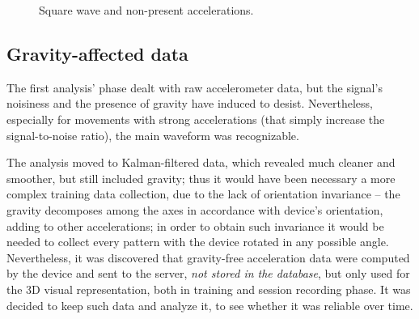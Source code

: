 \begin{center}
	\begin{figure}[ht]
		\caption{Square wave and non-present accelerations.}
	\end{figure}
\end{center}

\subsection{Gravity-affected data}
The first analysis' phase dealt with raw accelerometer data, but the signal's noisiness and the presence of gravity have induced to desist. Nevertheless, especially for movements with strong accelerations (that simply increase the signal-to-noise ratio), the main waveform was recognizable.
\bigbreak

The analysis moved to Kalman-filtered data, which revealed much cleaner and smoother, but still included gravity; thus it would have been necessary a more complex training data collection, due to the lack of orientation invariance – the gravity decomposes among the axes in accordance with device's orientation, adding to other accelerations; in order to obtain such invariance it would be needed to collect every pattern with the device rotated in any possible angle.\\
Nevertheless, it was discovered that gravity-free acceleration data were computed by the device and sent to the server, \textit{not stored in the database}, but only used for the 3D visual representation, both in training and session recording phase. It was decided to keep such data and analyze it, to see whether it was reliable over time.
\bigbreak

